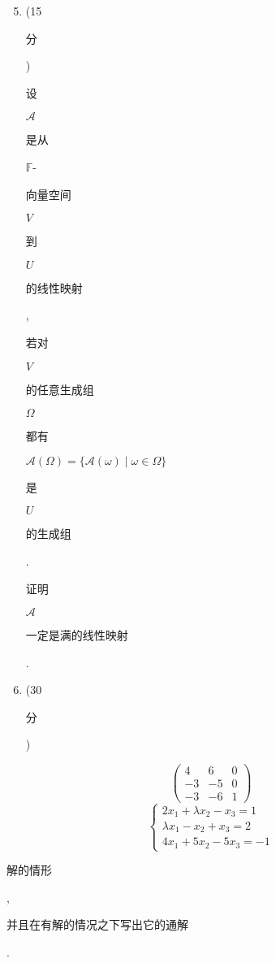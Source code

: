 \documentclass[10pt]{article}
\begin{document}
\begin{enumerate}
  \setcounter{enumi}{4}
  \item (15 \begin{CJK}{UTF8}{mj}分\end{CJK}) \begin{CJK}{UTF8}{mj}设\end{CJK} $\mathscr{A}$ \begin{CJK}{UTF8}{mj}是从\end{CJK} $\mathbb{F}$-\begin{CJK}{UTF8}{mj}向量空间\end{CJK} $V$ \begin{CJK}{UTF8}{mj}到\end{CJK} $U$ \begin{CJK}{UTF8}{mj}的线性映射\end{CJK}, \begin{CJK}{UTF8}{mj}若对\end{CJK} $V$ \begin{CJK}{UTF8}{mj}的任意生成组\end{CJK} $\Omega$ \begin{CJK}{UTF8}{mj}都有\end{CJK} $\mathscr{A}(\Omega)=\{\mathscr{A}(\omega) \mid \omega \in \Omega\}$ \begin{CJK}{UTF8}{mj}是\end{CJK} $U$ \begin{CJK}{UTF8}{mj}的生成组\end{CJK}. \begin{CJK}{UTF8}{mj}证明\end{CJK} $\mathscr{A}$ \begin{CJK}{UTF8}{mj}一定是满的线性映射\end{CJK}.

  \item (30 \begin{CJK}{UTF8}{mj}分\end{CJK})

\end{enumerate}
$$
\left(\begin{array}{ccc}
4 & 6 & 0 \\
-3 & -5 & 0 \\
-3 & -6 & 1
\end{array}\right)
$$
$$
\left\{\begin{array}{l}
2 x_{1}+\lambda x_{2}-x_{3}=1 \\
\lambda x_{1}-x_{2}+x_{3}=2 \\
4 x_{1}+5 x_{2}-5 x_{3}=-1
\end{array}\right.
$$
\begin{CJK}{UTF8}{mj}解的情形\end{CJK}, \begin{CJK}{UTF8}{mj}并且在有解的情况之下写出它的通解\end{CJK}.
\end{document}
